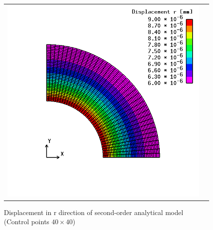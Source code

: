 \begin{figure}[htbp]
  \begin{tabular}{cc}
    \begin{minipage}[t]{0.45\hsize}
      \centering
      \includegraphics[keepaspectratio, scale=0.3]
      {fig/result_data_etc/iga/order2/2_40x40.png}
      \caption{Displacement in r direction of second-order analytical model (Control points $40\times 40$)}
      \label{fig:iga 03}
    \end{minipage} &
    \begin{minipage}[t]{0.45\hsize}
      \centering
      \includegraphics[keepaspectratio, scale=0.3]

\end{minipage}
\end{tabular}
\end{figure}
